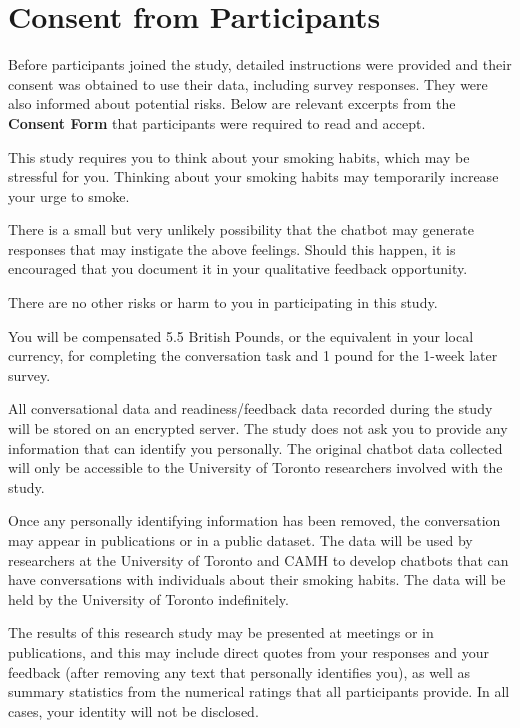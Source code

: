 \chapter{Consent from Participants}
\label{app-consent}


Before participants joined the study,  detailed instructions were provided and their consent was obtained to use their data, including survey responses. They were also informed about potential risks. Below are relevant excerpts from the \textbf{Consent Form} that participants were required to read and accept.
    

\vspace{12pt}

\begin{tcolorbox}[breakable,title=WHAT ARE THE RISKS OR HARM OF PARTICIPATING IN THIS STUDY?]
This study requires you to think about your smoking habits, which may be stressful for you. Thinking about your smoking habits may temporarily increase your urge to smoke. 

There is a small but very unlikely possibility that the chatbot may generate responses that may instigate the above feelings. Should this happen, it is encouraged that you document it in your qualitative feedback opportunity.

There are no other risks or harm to you in participating in this study.
\end{tcolorbox}

\vspace{12pt}

\begin{tcolorbox}[breakable,title=WHAT COMPENSATION AM I ENTITLED TO?]
You will be compensated 5.5 British Pounds, or the equivalent in your local currency, for completing the conversation task and 1 pound for the 1-week later survey.
\end{tcolorbox}

\vspace{12pt}

\begin{tcolorbox}[breakable,title=HOW WILL MY PRIVACY BE RESPECTED?]
All conversational data and readiness/feedback data recorded during the study will be stored on an encrypted server. The study does not ask you to provide any information that can identify you personally. The original chatbot data collected will only be accessible to the University of Toronto researchers involved with the study.

Once any personally identifying information has been removed, the conversation may appear in publications or in a public dataset. The data will be used by researchers at the University of Toronto and CAMH to develop chatbots that can have conversations with individuals about their smoking habits. The data will be held by the University of Toronto indefinitely.

The results of this research study may be presented at meetings or in publications, and this may include direct quotes from your responses and your feedback (after removing any text that personally identifies you), as well as summary statistics from the numerical ratings that all participants provide. In all cases, your identity will not be disclosed.
\end{tcolorbox}
